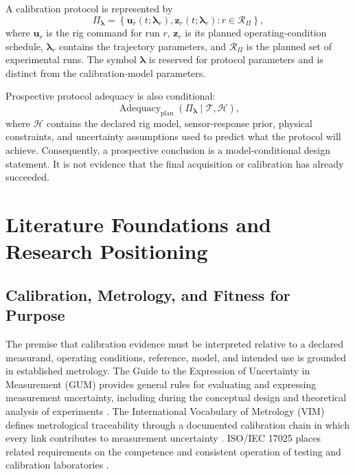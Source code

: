 \documentclass[11pt,a4paper]{article}
\begin{document}
A calibration protocol is represented by
\begin{equation}
    \Pi_{\boldsymbol{\lambda}}
    =
    \left\{
        \mathbf{u}_{r}(t;\boldsymbol{\lambda}_{r}),
        \mathbf{z}_{r}(t;\boldsymbol{\lambda}_{r})
        :
        r\in\mathcal{R}_{\Pi}
    \right\},
\end{equation}
where $\mathbf{u}_{r}$ is the rig command for run $r$,
$\mathbf{z}_{r}$ is its planned operating-condition schedule,
$\boldsymbol{\lambda}_{r}$ contains the trajectory parameters, and
$\mathcal{R}_{\Pi}$ is the planned set of experimental runs. The symbol
$\boldsymbol{\lambda}$ is reserved for protocol parameters and is distinct
from the calibration-model parameters.

Prospective protocol adequacy is also conditional:
\begin{equation}
    \operatorname{Adequacy}_{\mathrm{plan}}
    \left(
        \Pi_{\boldsymbol{\lambda}}
        \mid
        \mathcal{T},
        \mathcal{H}
    \right),
\end{equation}
where $\mathcal{H}$ contains the declared rig model, sensor-response prior,
physical constraints, and uncertainty assumptions used to predict what the
protocol will achieve. Consequently, a prospective conclusion is a
model-conditional design statement. It is not evidence that the final
acquisition or calibration has already succeeded.

\section{Literature Foundations and Research Positioning}

\subsection{Calibration, Metrology, and Fitness for Purpose}

The premise that calibration evidence must be interpreted relative to a
declared measurand, operating conditions, reference, model, and intended use is
grounded in established metrology. The Guide to the Expression of Uncertainty
in Measurement (GUM) provides general rules for evaluating and expressing
measurement uncertainty, including during the conceptual design and theoretical
analysis of experiments \cite{jcgm100}. The International Vocabulary of
Metrology (VIM) defines metrological traceability through a documented
calibration chain in which every link contributes to measurement uncertainty
\cite{jcgm200}. ISO/IEC 17025 places related requirements on the competence and
consistent operation of testing and calibration laboratories
\cite{iso17025}.
\end{document}
